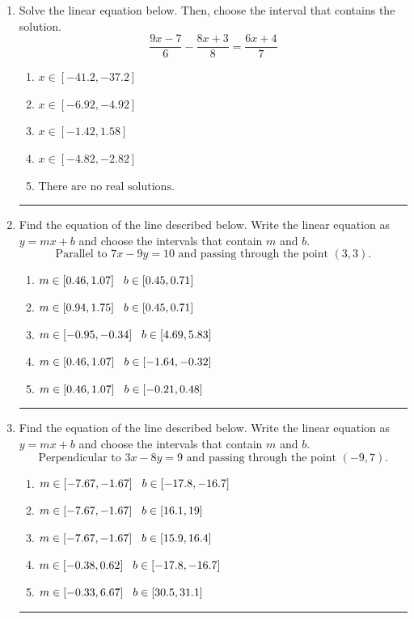\documentclass[14pt]{extbook}
\newcommand{\litem}[1]{\item#1\hspace*{-1cm}\rule{\textwidth}{0.4pt}}
\begin{document}
\begin{enumerate}
\litem{
Solve the linear equation below. Then, choose the interval that contains the solution.\[ \frac{9x -7}{6} - \frac{8x + 3}{8} = \frac{6x + 4}{7} \]\begin{enumerate}[label=\Alph*.]
\item \( x \in [-41.2, -37.2] \)
\item \( x \in [-6.92, -4.92] \)
\item \( x \in [-1.42, 1.58] \)
\item \( x \in [-4.82, -2.82] \)
\item \( \text{There are no real solutions.} \)

\end{enumerate} }
\litem{
Find the equation of the line described below. Write the linear equation as $ y=mx+b $ and choose the intervals that contain $m$ and $b$.\[ \text{Parallel to } 7 x - 9 y = 10 \text{ and passing through the point } (3, 3). \]\begin{enumerate}[label=\Alph*.]
\item \( m \in [0.46, 1.07] \hspace*{3mm} b \in [0.45, 0.71] \)
\item \( m \in [0.94, 1.75] \hspace*{3mm} b \in [0.45, 0.71] \)
\item \( m \in [-0.95, -0.34] \hspace*{3mm} b \in [4.69, 5.83] \)
\item \( m \in [0.46, 1.07] \hspace*{3mm} b \in [-1.64, -0.32] \)
\item \( m \in [0.46, 1.07] \hspace*{3mm} b \in [-0.21, 0.48] \)

\end{enumerate} }
\litem{
Find the equation of the line described below. Write the linear equation as $ y=mx+b $ and choose the intervals that contain $m$ and $b$.\[ \text{Perpendicular to } 3 x - 8 y = 9 \text{ and passing through the point } (-9, 7). \]\begin{enumerate}[label=\Alph*.]
\item \( m \in [-7.67, -1.67] \hspace*{3mm} b \in [-17.8, -16.7] \)
\item \( m \in [-7.67, -1.67] \hspace*{3mm} b \in [16.1, 19] \)
\item \( m \in [-7.67, -1.67] \hspace*{3mm} b \in [15.9, 16.4] \)
\item \( m \in [-0.38, 0.62] \hspace*{3mm} b \in [-17.8, -16.7] \)
\item \( m \in [-0.33, 6.67] \hspace*{3mm} b \in [30.5, 31.1] \)


\end{enumerate}}
\end{enumerate}
\end{document}
